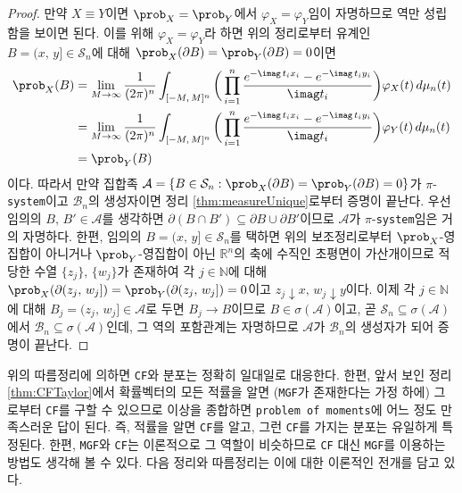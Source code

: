 \begin{proof}
    만약 $X\equiv Y$이면 $\prob_X=\prob_Y$에서 $\varphi_X=\varphi_Y$임이 자명하므로 역만 성립함을 보이면 된다. 이를 위해 $\varphi_X=\varphi_Y$라 하면 위의 정리로부터 유계인 $B=(x,\,y]\in\mathcal{S}_n$에 대해 $\prob_X(\partial B)=\prob_Y(\partial B)=0$이면
    \begin{align*}
        \prob_X(B)&=\lim_{M\to\infty}\frac{1}{(2\pi)^n}\int_{[-M,\,M]^n}\bigg(\prod_{i=1}^n\frac{e^{-\imag\,t_ix_i}-e^{-\imag\,t_iy_i}}{\imag t_i}\bigg)\varphi_X(t)\,d\mu_n(t)\\
        &=\lim_{M\to\infty}\frac{1}{(2\pi)^n}\int_{[-M,\,M]^n}\bigg(\prod_{i=1}^n\frac{e^{-\imag\,t_ix_i}-e^{-\imag\,t_iy_i}}{\imag t_i}\bigg)\varphi_Y(t)\,d\mu_n(t)\\
        &=\prob_Y(B)
    \end{align*}
    이다. 따라서 만약 집합족 $\mathcal{A}=\{B\in\mathcal{S}_n:\prob_X(\partial B)=\prob_Y(\partial B)=0\}$가 $\pi$-\texttt{system}이고 $\mathcal{B}_n$의 생성자이면 정리 \ref{thm:measureUnique}로부터 증명이 끝난다. 우선 임의의 $B,\,B'\in\mathcal{A}$를 생각하면 $\partial(B\cap B')\subseteq\partial B\cup\partial B'$이므로 $\mathcal{A}$가 $\pi$-\texttt{system}임은 거의 자명하다. 한편, 임의의 $B=(x,\,y]\in\mathcal{S}_n$를 택하면 위의 보조정리로부터 $\prob_X$-영집합이 아니거나 $\prob_Y$-영집합이 아닌 $\mathbb{R}^n$의 축에 수직인 초평면이 가산개이므로 적당한 수열 $\{z_j\},\,\{w_j\}$가 존재하여 각 $j\in\mathbb{N}$에 대해 $\prob_X(\partial(z_j,\,w_j])=\prob_Y(\partial(z_j,\,w_j])=0$이고 $z_j\downarrow x,\,w_j\downarrow y$이다. 이제 각 $j\in\mathbb{N}$에 대해 $B_j=(z_j,\,w_j]\in\mathcal{A}$로 두면 $B_j\to B$이므로 $B\in\sigma(\mathcal{A})$이고, 곧 $\mathcal{S}_n\subseteq\sigma(\mathcal{A})$에서 $\mathcal{B}_n\subseteq\sigma(\mathcal{A})$인데, 그 역의 포함관계는 자명하므로 $\mathcal{A}$가 $\mathcal{B}_n$의 생성자가 되어 증명이 끝난다.
\end{proof}

위의 따름정리에 의하면 \texttt{CF}와 분포는 정확히 일대일로 대응한다. 한편, 앞서 보인 정리 \ref{thm:CFTaylor}에서 확률벡터의 모든 적률을 알면 (\texttt{MGF}가 존재한다는 가정 하에) 그로부터 \texttt{CF}를 구할 수 있으므로 이상을 종합하면 \texttt{problem of moments}에 어느 정도 만족스러운 답이 된다. 즉, 적률을 알면 \texttt{CF}를 알고, 그런 \texttt{CF}를 가지는 분포는 유일하게 특정된다. 한편, \texttt{MGF}와 \texttt{CF}는 이론적으로 그 역할이 비슷하므로 \texttt{CF} 대신 \texttt{MGF}를 이용하는 방법도 생각해 볼 수 있다. 다음 정리와 따름정리는 이에 대한 이론적인 전개를 담고 있다.

